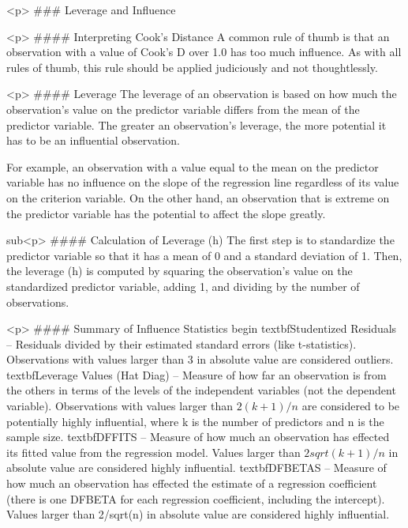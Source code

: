 <p>
### {Leverage and Influence}


<p>
#### {Interpreting Cook's Distance}
A common rule of thumb is that an observation with a value of Cook's D over 1.0 has too much influence. As with all rules of thumb, this rule should be applied judiciously and not thoughtlessly.

<p>
#### {Leverage}
The leverage of an observation is based on how much the observation's value on the predictor variable differs from the mean of the predictor variable. The greater an observation's leverage, the more potential it has to be an influential observation. 

For example, an observation with a value equal to the mean on the predictor variable has no influence on the slope of the regression line regardless of its value on the criterion variable. On the other hand, an observation that is extreme on the predictor variable has the potential to affect the slope greatly.

sub<p>
#### {Calculation of Leverage (h)}
The first step is to standardize the predictor variable so that it has a mean of 0 and a standard deviation of 1. Then, the leverage (h) is computed by squaring the observation's value on the standardized predictor variable, adding 1, and dividing by the number of observations.


<p>
#### {Summary of Influence Statistics}
begin{ }
	      	textbf{Studentized Residuals} – Residuals divided by their estimated standard errors (like t-statistics). Observations with values larger than 3 in absolute value are considered outliers.
	      	textbf{Leverage Values (Hat Diag)} – Measure of how far an observation is from the others in terms of the levels of the independent variables (not the dependent variable). Observations with values larger than $2(k+1)/n$ are considered to be potentially highly influential, where k is the number of predictors and n is the sample size.
	      	textbf{DFFITS} – Measure of how much an observation has effected its fitted value from the regression model. Values larger than $2sqrt{(k+1)/n}$ in absolute value are considered highly influential. %
	      	textbf{DFBETAS} – Measure of how much an observation has effected the estimate of a regression coefficient (there is one DFBETA for each regression coefficient, including the intercept). Values larger than 2/sqrt(n) in absolute value are considered highly influential.
	
